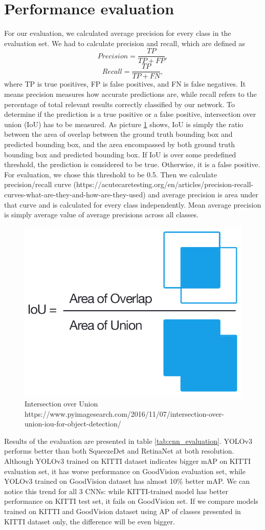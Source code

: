 \documentclass[twoside]{ctuthesis}
\theoremstyle{plain}
\theoremstyle{definition}
\theoremstyle{note}
\begin{document}
\section{Performance evaluation}
For our evaluation, we calculated average precision for every class in the evaluation set. We had to calculate precision and recall, which are defined as
\begin{equation}
Precision = \frac{TP}{TP+FP},
\end{equation}
\begin{equation}
Recall = \frac{TP}{TP+FN},
\end{equation}
where TP is true positives, FP is false positives, and FN is false negatives.
It means precision measures how accurate predictions are, while recall refers to the percentage of total relevant results correctly classified by our network.
To determine if the prediction is a true positive or a false positive, intersection over union (IoU) has to be measured. As picture \ref{iou} shows, IoU is simply the ratio between the area of overlap between the ground truth bounding box and predicted bounding box, and the area encompassed by both ground truth bounding box and predicted bounding box. If IoU is over some predefined threshold, the prediction is considered to be true. Otherwise, it is a false positive. For evaluation, we chose this threshold to be 0.5.
Then we calculate precision/recall curve (https://acutecaretesting.org/en/articles/precision-recall-curves-what-are-they-and-how-are-they-used) and average precision is area under that curve and is calculated for every class independently. Mean average precision is simply average value of average precisions across all classes. 
\begin{figure}[h]
\caption{Intersection over Union https://www.pyimagesearch.com/2016/11/07/intersection-over-union-iou-for-object-detection/}
\label{iou}
\includegraphics[width=.4\textwidth]{images/experiments/iou_equation.png}
\end{figure}
Results of the evaluation are presented in table \ref{tab:cnn_evaluation}. YOLOv3 performs better than both SqueezeDet and RetinaNet at both resolution. Although YOLOv3 trained on KITTI dataset indicates bigger mAP on KITTI evaluation set, it has worse performance on GoodVision evaluation set, while YOLOv3 trained on GoodVision dataset has almost 10\% better mAP. We can notice this trend for all 3 CNNs: while KITTI-trained model has better performance on KITTI test set, it fails on GoodVision set. If we compare models trained on KITTI and GoodVision dataset using AP of classes presented in KITTI dataset only, the difference will be even bigger. 
\end{document}

